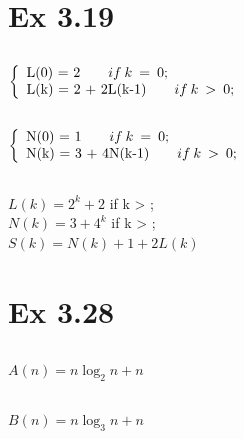 \section{Ex 3.19}
\subsection{}
\begin{math}
  \left\{
    \begin{array}{l}
      $L(0) = 2$             \qquad             if \: k \:  = \: 0;\\
      $L(k) = 2 + 2L(k-1)$     \qquad      if  \: k  \: > \: 0;\\
    \end{array}
  \right.
\end{math}

\subsection{}
\begin{math}
  \left\{
    \begin{array}{l}
      $N(0) = 1$             \qquad             if \: k \:  = \: 0;\\
      $N(k) = 3 + 4N(k-1)$     \qquad      if  \: k  \: > \: 0;\\
    \end{array}
  \right.
\end{math}


\subsection{}
 
$L(k) = 2^{k}+2$     \qquad      if  \: k  \: > ;\\
$N(k) = 3+4^{k}$    \qquad      if  \: k  \: > ;\\
$S(k) = N(k)+1+2L(k)$


\section{Ex 3.28}
\subsection{}
$A(n) = n{\log_2 n}+n$


\subsection{}
$B(n) = n{\log_3 n}+n$

